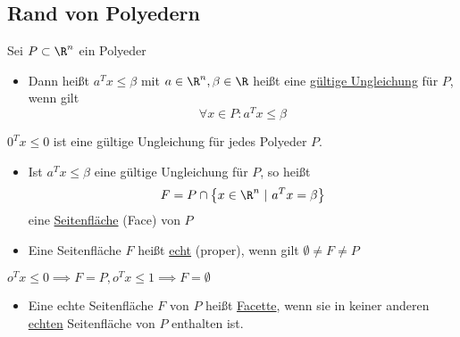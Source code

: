 \subsection{Rand von Polyedern}
\begin{definition}
	Sei $P \subset \R^n$ ein Polyeder
	\begin{itemize}
		\item Dann heißt $a^{T} x \leq \beta$ mit $a \in \R^n, \beta \in \R$ heißt eine \underline{gültige Ungleichung} für $P$, wenn gilt
			 \begin{equation*}
				\forall x \in P: a^{T} x \leq \beta
			\end{equation*}
	\end{itemize}
\end{definition}
\begin{beispiel}
  $0^{T} x \leq 0$ ist eine gültige Ungleichung für jedes Polyeder $P$.
\end{beispiel}
\begin{itemize}
  \item Ist $a^{T} x \leq \beta$ eine gültige Ungleichung für $P$, so heißt
    \begin{equation*}
      F = P \cap \left\{ x \in \R^n\ |\ a^{T} x = \beta \right\}
    \end{equation*}
    eine \underline{Seitenfläche} (Face) von $P$
  \item Eine Seitenfläche $F$ heißt \underline{echt} (proper), wenn gilt $\emptyset \neq F \neq P$
\end{itemize}
\begin{beispiel}
  $o^{T} x \leq 0 \implies F = P, o^{T} x \leq 1 \implies F = \emptyset$
\end{beispiel}
\begin{itemize}
  \item Eine echte Seitenfläche $F$ von $P$ heißt \underline{Facette}, wenn sie in keiner anderen \underline{echten} Seitenfläche von  $P$ enthalten ist.
\end{itemize}
